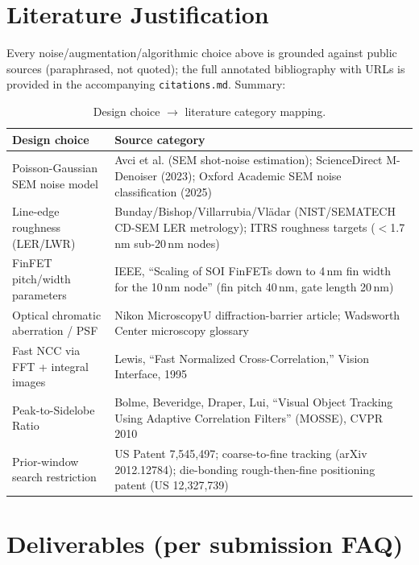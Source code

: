 \documentclass[11pt]{article}
\begin{document}
\section{Literature Justification}
\label{sec:citations}

Every noise/augmentation/algorithmic choice above is grounded against
public sources (paraphrased, not quoted); the full annotated bibliography
with URLs is provided in the accompanying \texttt{citations.md}. Summary:

\begin{table}[H]
\centering
\caption{Design choice $\to$ literature category mapping.}
\begin{tabular}{p{5.2cm}p{9.3cm}}
\toprule
Design choice & Source category \\
\midrule
Poisson-Gaussian SEM noise model &
  Avci et al. (SEM shot-noise estimation); ScienceDirect M-Denoiser
  (2023); Oxford Academic SEM noise classification (2025) \\
Line-edge roughness (LER/LWR) &
  Bunday/Bishop/Villarrubia/Vlädar (NIST/SEMATECH CD-SEM LER metrology);
  ITRS roughness targets ($<$1.7\,nm sub-20\,nm nodes) \\
FinFET pitch/width parameters &
  IEEE, ``Scaling of SOI FinFETs down to 4\,nm fin width for the 10\,nm
  node'' (fin pitch 40\,nm, gate length 20\,nm) \\
Optical chromatic aberration / PSF &
  Nikon MicroscopyU diffraction-barrier article; Wadsworth Center
  microscopy glossary \\
Fast NCC via FFT + integral images &
  Lewis, ``Fast Normalized Cross-Correlation,'' Vision Interface, 1995 \\
Peak-to-Sidelobe Ratio &
  Bolme, Beveridge, Draper, Lui, ``Visual Object Tracking Using
  Adaptive Correlation Filters'' (MOSSE), CVPR 2010 \\
Prior-window search restriction &
  US Patent 7,545,497; coarse-to-fine tracking (arXiv 2012.12784);
  die-bonding rough-then-fine positioning patent (US 12,327,739) \\
\bottomrule
\end{tabular}
\end{table}

\section{Deliverables (per submission FAQ)}
\end{document}
